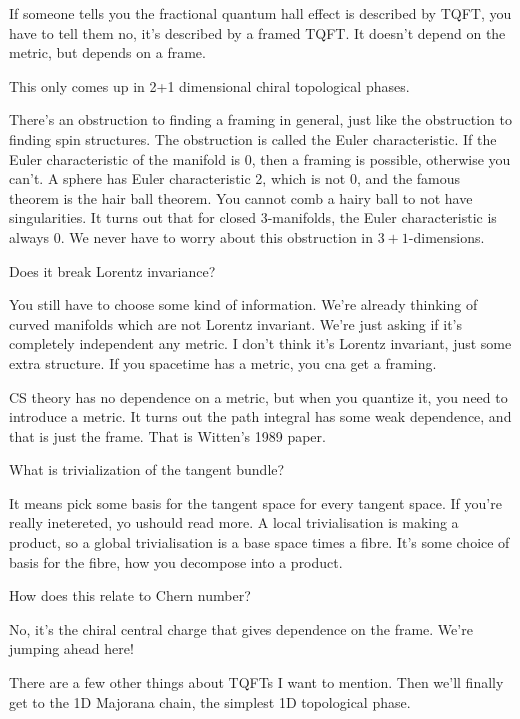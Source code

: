 If someone tells you the fractional quantum hall effect is described by TQFT,
you have to tell them no,
it's described by a framed TQFT.
It doesn't depend on the metric,
but depends on a frame.

This only comes up in 2+1 dimensional chiral topological phases.

There's an obstruction to finding a framing in general,
just like the obstruction to finding spin structures.
The obstruction is called the Euler characteristic.
If the Euler characteristic of the manifold is 0,
then a framing is possible,
otherwise you can't.
A sphere has Euler characteristic 2, which is not 0,
and the famous theorem is the hair ball theorem.
You cannot comb a hairy ball to not have singularities.
It turns out that for closed 3-manifolds,
the Euler characteristic is always 0.
We never have to worry about this obstruction in $3+1$-dimensions.

\begin{question}
    Does it break Lorentz invariance?
\end{question}
You still have to choose some kind of information.
We're already thinking of curved manifolds
which are not Lorentz invariant.
We're just asking if it's completely independent any metric.
I don't think it's Lorentz invariant,
just some extra structure.
If you spacetime has a metric,
you cna get a framing.

CS theory has no dependence on a metric,
but when you quantize it,
you need to introduce a metric.
It turns out the path integral has some weak dependence,
and that is just the frame.
That is Witten's 1989 paper.

\begin{question}
    What is trivialization of the tangent bundle?
\end{question}
It means pick some basis for the tangent space for every tangent space.
If you're really inetereted, yo ushould read more.
A local trivialisation is making a product,
so a global trivialisation is a base space times a fibre.
It's some choice of basis for the fibre,
how you decompose into a product.

\begin{question}
    How does this relate to Chern number?
\end{question}
No, it's the chiral central charge that gives dependence on the frame.
We're jumping ahead here!

There are a few other things about TQFTs I want to mention.
Then we'll finally get to the 1D Majorana chain,
the simplest 1D topological phase.
